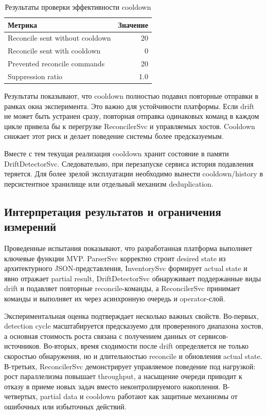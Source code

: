 \begin{table}
    \centering
    \caption{Результаты проверки эффективности cooldown}
    \label{tab:ch4-cooldown}
    \footnotesize
    \begin{tabularx}{0.85\textwidth}{|X|r|}\hline
    Метрика & Значение \\ \hline
    Reconcile sent without cooldown & 20 \\ \hline
    Reconcile sent with cooldown & 0 \\ \hline
    Prevented reconcile commands & 20 \\ \hline
    Suppression ratio & 1.0 \\ \hline
    \end{tabularx}
    \normalsize
\end{table}

Результаты показывают, что cooldown полностью подавил повторные отправки в рамках окна эксперимента. Это важно для устойчивости платформы. Если drift не может быть устранен сразу, повторная отправка одинаковых команд в каждом цикле привела бы к перегрузке ReconcilerSvc и управляемых хостов. Cooldown снижает этот риск и делает поведение системы более предсказуемым.

Вместе с тем текущая реализация cooldown хранит состояние в памяти DriftDetectorSvc. Следовательно, при перезапуске сервиса история подавления теряется. Для более зрелой эксплуатации необходимо вынести cooldown/history в персистентное хранилище или отдельный механизм deduplication.

\subsection{Интерпретация результатов и ограничения измерений}

Проведенные испытания показывают, что разработанная платформа выполняет ключевые функции MVP. ParserSvc корректно строит desired state из архитектурного JSON-представления, InventorySvc формирует actual state и явно отражает partial result, DriftDetectorSvc обнаруживает поддержанные виды drift и подавляет повторные reconcile-команды, а ReconcilerSvc принимает команды и выполняет их через асинхронную очередь и operator-слой.

Экспериментальная оценка подтверждает несколько важных свойств. Во-первых, detection cycle масштабируется предсказуемо для проверенного диапазона хостов, а основная стоимость роста связана с получением данных от сервисов-источников. Во-вторых, время сходимости после drift определяется не только скоростью обнаружения, но и длительностью reconcile и обновления actual state. В-третьих, ReconcilerSvc демонстрирует управляемое поведение под нагрузкой: рост параллелизма повышает throughput, а насыщение очереди приводит к отказу в приеме новых задач вместо неконтролируемого накопления. В-четвертых, partial data и cooldown работают как защитные механизмы от ошибочных или избыточных действий.

